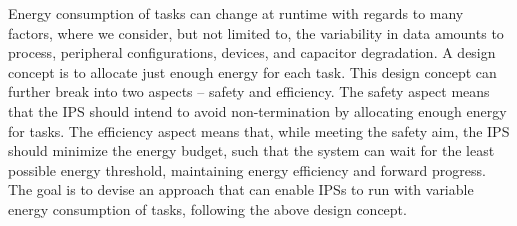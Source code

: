 \begin{enumerate}
Energy consumption of tasks can change at runtime with regards to many factors, where we consider, but not limited to, the variability in data amounts to process, peripheral configurations, devices, and capacitor degradation. 
A design concept is to allocate just enough energy for each task.
This design concept can further break into two aspects -- safety and efficiency. 
The safety aspect means that the IPS should intend to avoid non-termination by allocating enough energy for tasks.
The efficiency aspect means that, while meeting the safety aim, the IPS should minimize the energy budget, such that the system can wait for the least possible energy threshold, maintaining energy efficiency and forward progress. 
The goal is to devise an approach that can enable IPSs to run with variable energy consumption of tasks, following the above design concept. 





\end{enumerate}
